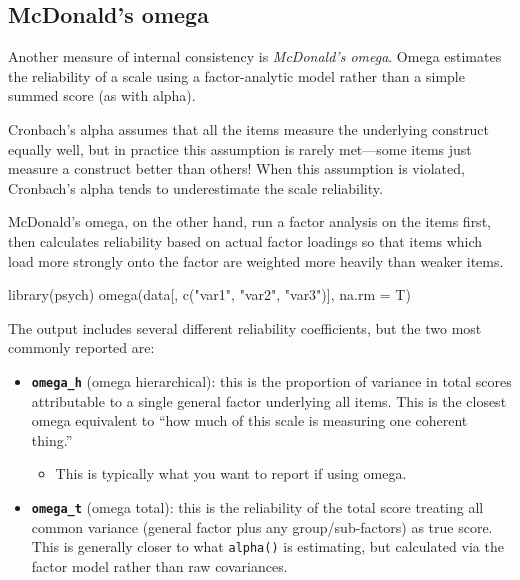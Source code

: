 \documentclass[
  letterpaper,
  DIV=11,
  numbers=noendperiod]{scrreprt}
\newenvironment{Shaded}{\begin{snugshade}}{\end{snugshade}}
\newcommand{\AttributeTok}[1]{\textcolor[rgb]{0.40,0.45,0.13}{#1}}
\newcommand{\FunctionTok}[1]{\textcolor[rgb]{0.28,0.35,0.67}{#1}}
\newcommand{\NormalTok}[1]{\textcolor[rgb]{0.00,0.23,0.31}{#1}}
\newcommand{\StringTok}[1]{\textcolor[rgb]{0.13,0.47,0.30}{#1}}
\providecommand{\tightlist}{%
  \setlength{\itemsep}{0pt}\setlength{\parskip}{0pt}}\usepackage{longtable,booktabs,array}
\begin{document}
\subsection{McDonald's omega}\label{mcdonalds-omega}

Another measure of internal consistency is \emph{McDonald's omega}.
Omega estimates the reliability of a scale using a factor-analytic model
rather than a simple summed score (as with alpha).

Cronbach's alpha assumes that all the items measure the underlying
construct equally well, but in practice this assumption is rarely
met---some items just measure a construct better than others! When this
assumption is violated, Cronbach's alpha tends to underestimate the
scale reliability.

McDonald's omega, on the other hand, run a factor analysis on the items
first, then calculates reliability based on actual factor loadings so
that items which load more strongly onto the factor are weighted more
heavily than weaker items.

\begin{Shaded}
\begin{Highlighting}[]
\FunctionTok{library}\NormalTok{(psych)}
\FunctionTok{omega}\NormalTok{(data[, }\FunctionTok{c}\NormalTok{(}\StringTok{"var1"}\NormalTok{, }\StringTok{"var2"}\NormalTok{, }\StringTok{"var3"}\NormalTok{)], }\AttributeTok{na.rm =}\NormalTok{ T)}
\end{Highlighting}
\end{Shaded}

The output includes several different reliability coefficients, but the
two most commonly reported are:

\begin{itemize}
\item
  \textbf{\texttt{omega\_h}} (omega hierarchical): this is the
  proportion of variance in total scores attributable to a single
  general factor underlying all items. This is the closest omega
  equivalent to ``how much of this scale is measuring one coherent
  thing.''

  \begin{itemize}
  \tightlist
  \item
    This is typically what you want to report if using omega.
  \end{itemize}
\item
  \textbf{\texttt{omega\_t}} (omega total): this is the reliability of
  the total score treating all common variance (general factor plus any
  group/sub-factors) as true score. This is generally closer to what
  \texttt{alpha()} is estimating, but calculated via the factor model
  rather than raw covariances.
\end{itemize}
\end{document}
